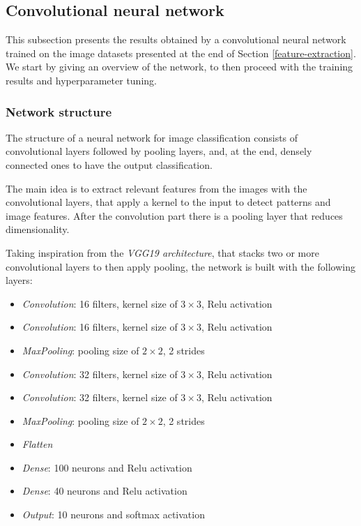 \subsection{Convolutional neural network}
This subsection presents the results obtained by a convolutional
neural network trained on the image datasets presented at the end of 
Section \vref*{feature-extraction}.
We start by giving an overview of the network, to then proceed 
with the training results and hyperparameter tuning.

\subsubsection{Network structure}
The structure of a neural network for image classification 
consists of convolutional layers followed by pooling layers, 
and, at the end, densely connected ones to have the output classification.

The main idea is to extract relevant features from the images 
with the convolutional layers, that apply a kernel to the input 
to detect patterns and image features.
After the convolution part there is a pooling layer that reduces dimensionality.

Taking inspiration from the \emph{VGG19 architecture}, that stacks two or more 
convolutional layers to then apply pooling, the network is built with 
the following layers:~\cite{vgg}
\begin{itemize}
    \item \emph{Convolution}: 16 filters, kernel size of $3 \times 3$, Relu activation
    \item \emph{Convolution}: 16 filters, kernel size of $3 \times 3$, Relu activation
    \item \emph{MaxPooling}: pooling size of $2 \times 2$, 2 strides
    \item \emph{Convolution}: 32 filters, kernel size of $3 \times 3$, Relu activation
    \item \emph{Convolution}: 32 filters, kernel size of $3 \times 3$, Relu activation
    \item \emph{MaxPooling}: pooling size of $2 \times 2$, 2 strides
    \item \emph{Flatten}
    \item \emph{Dense}: 100 neurons and Relu activation
    \item \emph{Dense}: 40 neurons and Relu activation
    \item \emph{Output}: 10 neurons and softmax activation
\end{itemize}

